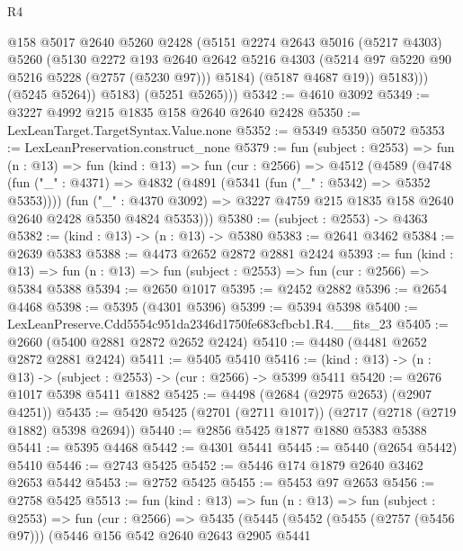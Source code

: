 \begin{lexlean}{R4}
\begin{coremodule}
                  @158
                  @5017
                  @2640
                  @5260
                  @2428
                  (@5151
                    @2274
                    @2643
                    @5016
                    (@5217 @4303)
                    @5260
                    (@5130
                      @2272
                      @193
                      @2640
                      @2642
                      @5216
                      @4303
                      (@5214 @97 @5220 @90 @5216 @5228 (@2757 (@5230 @97)))
                      @5184)
                    (@5187 @4687 @19))
                  @5183)))
            (@5245 @5264))
          @5183)
        (@5251 @5265)))
@5342 := @4610 @3092
@5349 := @3227 @4992 @215 @1835 @158 @2640 @2640 @2428
@5350 := LexLeanTarget.TargetSyntax.Value.none
@5352 := @5349 @5350 @5072
@5353 := LexLeanPreservation.construct_none
@5379 := fun (subject : @2553) =>
  fun (n : @13) =>
  fun (kind : @13) =>
  fun (cur : @2566) =>
  @4512
    (@4589
      (@4748
        (fun ("_" : @4371) => @4832 (@4891 (@5341 (fun ("_" : @5342) => @5352 @5353))))
        (fun ("_" : @4370 @3092) =>
        @3227 @4759 @215 @1835 @158 @2640 @2640 @2428 @5350 @4824 @5353)))
@5380 := (subject : @2553) -> @4363
@5382 := (kind : @13) -> (n : @13) -> @5380
@5383 := @2641 @3462
@5384 := @2639 @5383
@5388 := @4473 @2652 @2872 @2881 @2424
@5393 := fun (kind : @13) =>
  fun (n : @13) => fun (subject : @2553) => fun (cur : @2566) => @5384 @5388
@5394 := @2650 @1017
@5395 := @2452 @2882
@5396 := @2654 @4468
@5398 := @5395 (@4301 @5396)
@5399 := @5394 @5398
@5400 := LexLeanPreserve.Cdd5554c951da2346d1750fe683cfbcb1.R4.__fits_23
@5405 := @2660 (@5400 @2881 @2872 @2652 @2424)
@5410 := @4480 (@4481 @2652 @2872 @2881 @2424)
@5411 := @5405 @5410
@5416 := (kind : @13) -> (n : @13) -> (subject : @2553) -> (cur : @2566) -> @5399 @5411
@5420 := @2676 @1017 @5398 @5411 @1882
@5425 := @4498 (@2684 (@2975 @2653) (@2907 @4251))
@5435 := @5420 @5425 (@2701 (@2711 @1017)) (@2717 (@2718 (@2719 @1882) @5398 @2694))
@5440 := @2856 @5425 @1877 @1880 @5383 @5388
@5441 := @5395 @4468
@5442 := @4301 @5441
@5445 := @5440 (@2654 @5442) @5410
@5446 := @2743 @5425
@5452 := @5446 @174 @1879 @2640 @3462 @2653 @5442
@5453 := @2752 @5425
@5455 := @5453 @97 @2653
@5456 := @2758 @5425
@5513 := fun (kind : @13) =>
  fun (n : @13) =>
  fun (subject : @2553) =>
  fun (cur : @2566) =>
  @5435
    (@5445
      (@5452
        (@5455 (@2757 (@5456 @97)))
        (@5446
          @156
          @542
          @2640
          @2643
          @2905
          @5441

\end{coremodule}
\end{lexlean}
